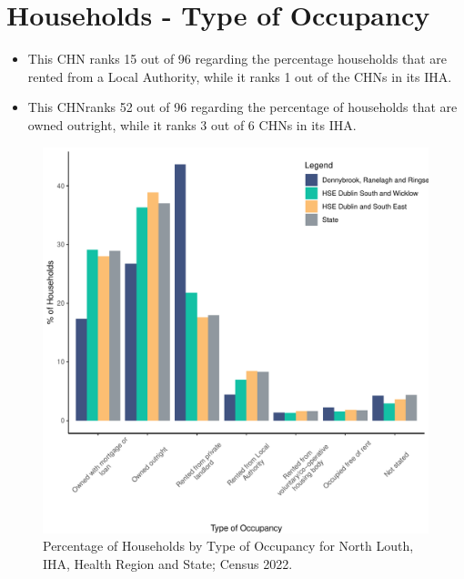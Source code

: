 \documentclass{article}
\begin{document}
\section{Households - Type of Occupancy}\label{sect:Households}
\begin{itemize}
\item This CHN ranks  15 out of 96 regarding the percentage households that are rented from a Local Authority, while it ranks  1 out of the CHNs in its IHA. 
\item This CHNranks  52 out of 96 regarding the percentage of households that are owned outright, while it ranks   3 out of 6 CHNs in its IHA.
\end{itemize}
\begin{figure}[H]
	\centering
	\includegraphics[width = 140mm]{../figures/HouseholdsED.pdf}
	\caption{Percentage of Households by Type of Occupancy for North Louth, IHA, Health Region and State; Census 2022.}
	\label{fig:vbnv}
	\end{figure}
\end{document}
